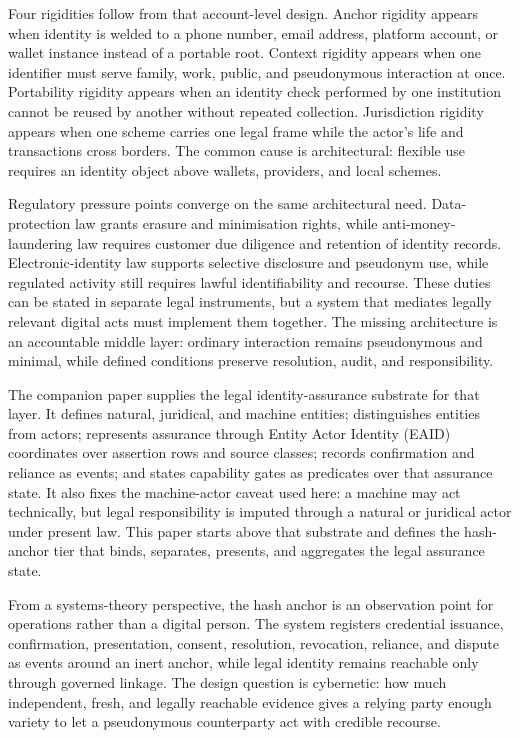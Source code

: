 \documentclass[oneside,10pt]{swissi}
\begin{document}
Four rigidities follow from that account-level design. Anchor rigidity appears when identity is welded to a phone number, email address, platform account, or wallet instance instead of a portable root. Context rigidity appears when one identifier must serve family, work, public, and pseudonymous interaction at once. Portability rigidity appears when an identity check performed by one institution cannot be reused by another without repeated collection. Jurisdiction rigidity appears when one scheme carries one legal frame while the actor's life and transactions cross borders. The common cause is architectural: flexible use requires an identity object above wallets, providers, and local schemes.

Regulatory pressure points converge on the same architectural need. Data-protection law grants erasure and minimisation rights, while anti-money-laundering law requires customer due diligence and retention of identity records.\cite{gdpr2016,amlr2024} Electronic-identity law supports selective disclosure and pseudonym use, while regulated activity still requires lawful identifiability and recourse.\cite{eidas2024} These duties can be stated in separate legal instruments, but a system that mediates legally relevant digital acts must implement them together. The missing architecture is an accountable middle layer: ordinary interaction remains pseudonymous and minimal, while defined conditions preserve resolution, audit, and responsibility.

The companion paper supplies the legal identity-assurance substrate for that layer.\cite{kurz2026actorassurance} It defines natural, juridical, and machine entities; distinguishes entities from actors; represents assurance through Entity Actor Identity (EAID) coordinates over assertion rows and source classes; records confirmation and reliance as events; and states capability gates as predicates over that assurance state. It also fixes the machine-actor caveat used here: a machine may act technically, but legal responsibility is imputed through a natural or juridical actor under present law. This paper starts above that substrate and defines the hash-anchor tier that binds, separates, presents, and aggregates the legal assurance state.

From a systems-theory perspective, the hash anchor is an observation point for operations rather than a digital person. The system registers credential issuance, confirmation, presentation, consent, resolution, revocation, reliance, and dispute as events around an inert anchor, while legal identity remains reachable only through governed linkage.\cite{luhmann1995social} The design question is cybernetic: how much independent, fresh, and legally reachable evidence gives a relying party enough variety to let a pseudonymous counterparty act with credible recourse.\cite{ashby1956introduction}
\end{document}
